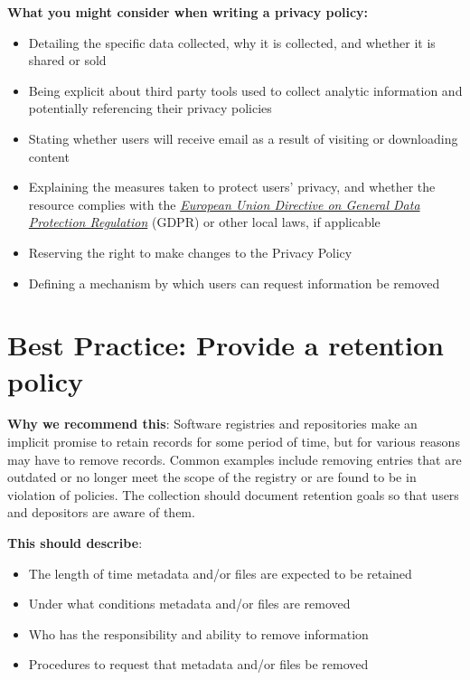 \documentclass[11pt]{article}
\begin{document}
\textbf{What you might consider when writing a privacy policy:}

\begin{itemize}
\item Detailing the specific data collected, why it is collected, and whether it is shared or sold

\item Being explicit about third party tools used to collect analytic information and potentially referencing their privacy policies

\item Stating whether users will receive email as a result of visiting or downloading content

\item Explaining the measures taken to protect users' privacy, and whether the resource complies with the \href{https://gdpr-info.eu/}{\emph{European Union Directive on General Data Protection Regulation}} (GDPR) or other local laws, if applicable

\item Reserving the right to make changes to the Privacy Policy

\item Defining a mechanism by which users can request information be removed

\end{itemize}


\section{Best Practice: Provide a retention policy}
\label{best-practice-provide-a-retention-policy}

\textbf{Why we recommend this}: Software registries and repositories make an implicit promise to retain records for some period of time, but for various reasons may have to remove records. Common examples include removing entries that are outdated or no longer meet the scope of the registry or are found to be in violation of policies. The collection should document retention goals so that users and depositors are aware of them.

\textbf{This should describe}:

\begin{itemize}
\item The length of time metadata and/or files are expected to be retained

\item Under what conditions metadata and/or files are removed

\item Who has the responsibility and ability to remove information

\item Procedures to request that metadata and/or files be removed

\end{itemize}
\end{document}
